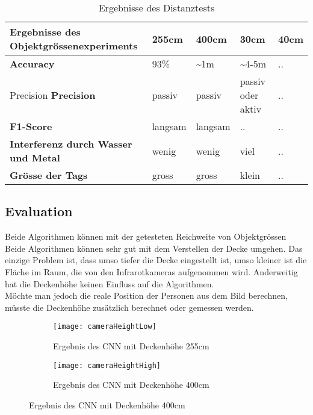\begin{table}[H]
	\begin{tabularx}{\textwidth}{|X|X|X|X|X|}
		\hline
		\textbf{Ergebnisse des Objektgrössenexperiments} & \textbf{255cm} & \textbf{400cm} & \textbf{30cm} & \textbf{40cm}\\
		\hline 
		\textbf{Accuracy} & 93\% & \textasciitilde 1m & \textasciitilde 4-5m & ..\\
		\hline  Precision
		\textbf{Precision} & passiv & passiv & passiv oder aktiv & ..\\
		\hline
		\textbf{F1-Score} & langsam & langsam & .. & ..\\
		\hline
		\textbf{Interferenz durch Wasser und Metal} & wenig & wenig & viel & ..\\
		\hline
		\textbf{Grösse der Tags} & gross & gross & klein & ..\\
		\hline
	\end{tabularx}
	\caption{Ergebnisse des Distanztests}
	\label{tbl:distance}
\end{table}

\subsection{Evaluation}
Beide Algorithmen können mit der getesteten Reichweite von Objektgrössen 
Beide Algorithmen können sehr gut mit dem Verstellen der Decke umgehen. Das einzige Problem ist, dass umso tiefer die Decke eingestellt ist, umso kleiner ist die Fläche im Raum, die von den Infrarotkameras aufgenommen wird. Anderweitig hat die Deckenhöhe keinen Einfluss auf die Algorithmen.\\
Möchte man jedoch die reale Position der Personen aus dem Bild berechnen, müsste die Deckenhöhe zusätzlich berechnet oder gemessen werden.

\begin{figure}[H]
	\begin{subfigure}{.45\linewidth}
		\centering
		\texttt{[image: cameraHeightLow]}
		\caption{Ergebnis des \gls{CNN} mit Deckenhöhe 255cm}
		\label{fig:cameraHeightLow}
	\end{subfigure}
	\begin{subfigure}{.45\linewidth}
		\centering
		\texttt{[image: cameraHeightHigh]}
		\caption{Ergebnis des \gls{CNN} mit Deckenhöhe 400cm}
		\label{fig:cameraHeightHigh}
	\end{subfigure}
\end{figure}


